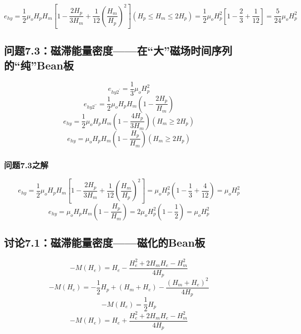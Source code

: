 \begin{equation}%
e_{hy}=\frac{1}{2}\mu_oH_pH_m\left[1-\frac{2H_p}{3H_m}+\frac{1}{12}\left(\frac{H_m}{H_p}\right)^2\right]    (H_p\leq H_m\leq 2H_p) 
=\frac{1}{2}\mu_oH_{p}^{2}\left[1-\frac{2}{3}+\frac{1}{12}\right]=\frac{5}{24}\mu_oH_{p}^{2}
\end{equation}


\subsection{问题7.3：磁滞能量密度——在“大”磁场时间序列的“纯”Bean板}

\begin{equation}%
e_{hy2^\prime}=\frac{1}{3}\mu_oH_{p}^{2}
\end{equation}
\begin{equation}%
e_{hy2^{\prime\prime}}=\frac{1}{2}\mu_oH_pH_m\left(1-\frac{2H_p}{H_m}\right)
\end{equation}
\begin{equation}%
e_{hy}=\frac{1}{2}\mu_oH_pH_m\left(1-\frac{4H_p}{3H_m}\right)     (H_m\geq 2H_p)
\end{equation}
\begin{equation}%
e_{hy}=\mu_oH_pH_m\left(1-\frac{H_p}{H_m}\right)      (H_m\geq 2H_p)
\end{equation}

\subsubsection{问题7.3之解}

\begin{equation}%
e_{hy}=\frac{1}{2}\mu_oH_pH_m\left[1-\frac{2H_p}{3H_m}+\frac{1}{12}\left(\frac{H_m}{H_p}\right)^2\right]
=\mu_oH_{p}^{2}\left(1-\frac{1}{3}+\frac{4}{12}\right)=\mu_oH_{p}^{2}
\end{equation}
\begin{equation}%
e_{hy}=\mu_oH_pH_m\left(1-\frac{H_p}{H_m}\right) 
=2\mu_oH_{p}^{2}\left(1-\frac{1}{2}\right)=\mu_oH_{p}^{2}
\end{equation}


\subsection{讨论7.1：磁滞能量密度——磁化的Bean板}

\begin{equation}%
-M(H_e)=H_e-\frac{H_{e}^{2}+2H_mH_e-H_{m}^{2}}{4H_p}
\end{equation}
\begin{equation}%
-M(H_e)=-\frac{1}{2}H_p+(H_m+H_e)-\frac{(H_m+H_e)^2}{4H_p}
\end{equation}
\begin{equation}%
-M(H_e)=\frac{1}{2}H_p
\end{equation}
\begin{equation}%
-M(H_e)=H_e+\frac{H_{e}^{2}+2H_mH_e-H_{m}^{2}}{4H_p}
\end{equation}


